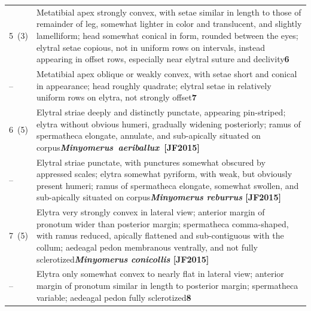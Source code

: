\documentclass[fleqn,10pt,lineno]{wlpeerj} %
\newcommand{\breakfill}{\dotfill\newline\penalty0\hbox{}\nobreak\dotfill}
\begin{document}
\begin{xtabular}{@{}
                p{\dimexpr.1\textwidth-\tabcolsep\relax}
                p{\dimexpr.9\textwidth-\tabcolsep\relax}@{}}
		{5~(3)} & {Metatibial apex strongly convex, with setae similar in length to those of remainder of leg, somewhat lighter in color and translucent, and slightly lamelliform; head somewhat conical in form, rounded between the eyes; elytral setae copious, not in uniform rows on intervals, instead appearing in offset rows, especially near elytral suture and declivity}{\dotfill}{\textbf{6}}\\
		{--} & {Metatibial apex oblique or weakly convex, with setae short and conical in appearance; head roughly quadrate; elytral setae in relatively uniform rows on elytra, not strongly offset}{\dotfill}{\textbf{7}}\\
		
		{6~(5)} & {Elytral striae deeply and distinctly punctate, appearing pin-striped; elytra without obvious humeri, gradually widening posteriorly; ramus of spermatheca elongate, annulate, and sub-apically situated on corpus}{\dotfill}{\mbox{\textbf{\textit{Minyomerus aeriballux} [JF2015]}}}\\
		{--} & {Elytral striae punctate, with punctures somewhat obscured by appressed scales; elytra somewhat pyriform, with weak, but obviously present humeri; ramus of spermatheca elongate, somewhat swollen, and sub-apically situated on corpus}{\breakfill}{\textbf{\textit{Minyomerus reburrus} [JF2015]}}\\
		
		{7~(5)} & {Elytra very strongly convex in lateral view; anterior margin of pronotum wider than posterior margin; spermatheca comma-shaped, with ramus reduced, apically flattened and sub-contiguous with the collum; aedeagal pedon membranous ventrally, and not fully sclerotized}{\breakfill}{\textbf{\textit{Minyomerus conicollis} [JF2015]}}\\
		{--} & {Elytra only somewhat convex to nearly flat in lateral view; anterior margin of pronotum similar in length to posterior margin; spermatheca variable; aedeagal pedon fully sclerotized}{\breakfill}{\textbf{8}}\\
		

\end{xtabular}
\end{document}
